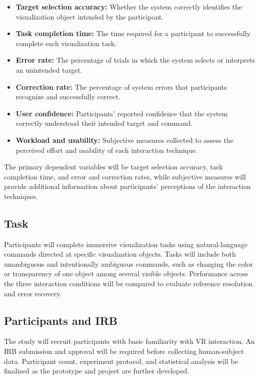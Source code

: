 \documentclass[sigconf,nonacm]{acmart}
\begin{document}
\begin{itemize}
\item \textbf{Target selection accuracy:} Whether the system correctly identifies the visualization object intended by the participant.
\item \textbf{Task completion time:} The time required for a participant to successfully complete each visualization task.
\item \textbf{Error rate:} The percentage of trials in which the system selects or interprets an unintended target.
\item\textbf{Correction rate:} The percentage of system errors that participants recognize and successfully correct.
\item \textbf{User confidence:} Participants' reported confidence that the system correctly understood their intended target and command.
\item \textbf{Workload and usability:} Subjective measures collected to assess the perceived effort and usability of each interaction technique.
\end{itemize}

The primary dependent variables will be target selection accuracy, task completion time, and error and correction rates, while subjective measures will provide additional information about participants' perceptions of the interaction techniques.

\subsection{Task}
Participants will complete immersive visualization tasks using natural-language commands directed at specific visualization objects. Tasks will include both unambiguous and intentionally ambiguous commands, such as changing the color or transparency of one object among several visible objects. Performance across the three interaction conditions will be compared to evaluate reference resolution and error recovery.

\subsection{Participants and IRB}
The study will recruit participants with basic familiarity with VR interaction. An IRB submission and approval will be required before collecting human-subject data. Participant count, experiment protocol, and statistical analysis will be finalized as the prototype and project are further developed.
\end{document}
